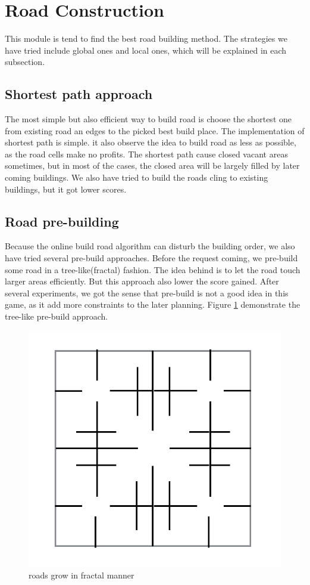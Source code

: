 \documentclass{article}
\begin{document}
\section{Road Construction}
This module is tend to find the best road building method. The strategies we have tried include global ones and local ones, which will be explained in each subsection.
\subsection{Shortest path approach}
The most simple but also efficient way to build road is choose the shortest one from existing road an edges to the picked best build place. The implementation of shortest path is simple. it also observe the idea to build road as less as possible, as the road cells make no profits. The shortest path cause closed vacant areas sometimes, but in most of the cases, the closed area will be largely filled by later coming buildings. We also have tried to build the roads cling to existing buildings, but it got lower scores.
\subsection{Road pre-building}
Because the online build road algorithm can disturb the building order, we also have tried several pre-build approaches. Before the request coming, we pre-build some road in a tree-like(fractal) fashion. The idea behind is to let the road touch larger areas efficiently. But this approach also lower the score gained. After several experiments, we got the sense that pre-build is not a good idea in this game, as it add more constraints to the later planning.
Figure \ref{fig: prebuildRoad} demonstrate the tree-like pre-build approach.

\begin{figure}
\center
\includegraphics[scale=0.5]{prebuildRoad.png}
\caption{roads grow in fractal manner}
\label{fig: prebuildRoad}
\end{figure}
\end{document}
